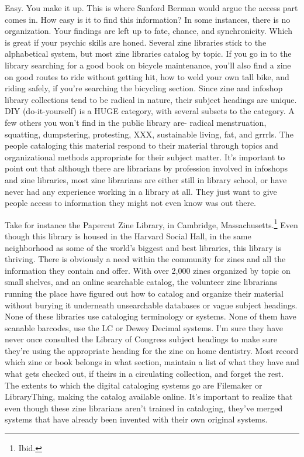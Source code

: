 \documentclass[output=paper]{langscibook}
\begin{document}
Easy. You make it up. This is where Sanford Berman would argue the
access part comes in. How easy is it to find this information? In some
instances, there is no organization. Your findings are left up to fate,
chance, and synchronicity. Which is great if your psychic skills are
honed. Several zine libraries stick to the alphabetical system, but most
zine libraries catalog by topic. If you go in to the library searching
for a good book on bicycle maintenance, you'll also find a zine on good
routes to ride without getting hit, how to weld your own tall bike, and
riding safely, if you're searching the bicycling section. Since zine and
infoshop library collections tend to be radical in nature, their subject
headings are unique. DIY (do-it-yourself) is a HUGE category, with
several subsets to the category. A few others you won't find in the
public library are- radical menstruation, squatting, dumpstering,
protesting, XXX, sustainable living, fat, and grrrls. The people
cataloging this material respond to their material through topics and
organizational methods appropriate for their subject matter. It's
important to point out that although there are librarians by profession
involved in infoshops and zine libraries, most zine librarians are
either still in library school, or have never had any experience working
in a library at all. They just want to give people access to information
they might not even know was out there.

Take for instance the Papercut Zine Library, in Cambridge,
Massachusetts.\footnote{Ibid.} Even though this library is housed in the
Harvard Social Hall, in the same neighborhood as some of the world's
biggest and best libraries, this library is thriving. There is obviously
a need within the community for zines and all the information they
contain and offer. With over 2,000 zines organized by topic on small
shelves, and an online searchable catalog, the volunteer zine librarians
running the place have figured out how to catalog and organize their
material without burying it underneath unsearchable databases or vague
subject headings. None of these libraries use cataloging terminology or
systems. None of them have scanable barcodes, use the LC or Dewey
Decimal systems. I'm sure they have never once consulted the Library of
Congress subject headings to make sure they're using the appropriate
heading for the zine on home dentistry. Most record which zine or book
belongs in what section, maintain a list of what they have and what gets
checked out, if theirs in a circulating collection, and forget the rest.
The extents to which the digital cataloging systems go are Filemaker or
LibraryThing, making the catalog available online. It's important to
realize that even though these zine librarians aren't trained in
cataloging, they've merged systems that have already been invented with
their own original systems.
\end{document}
